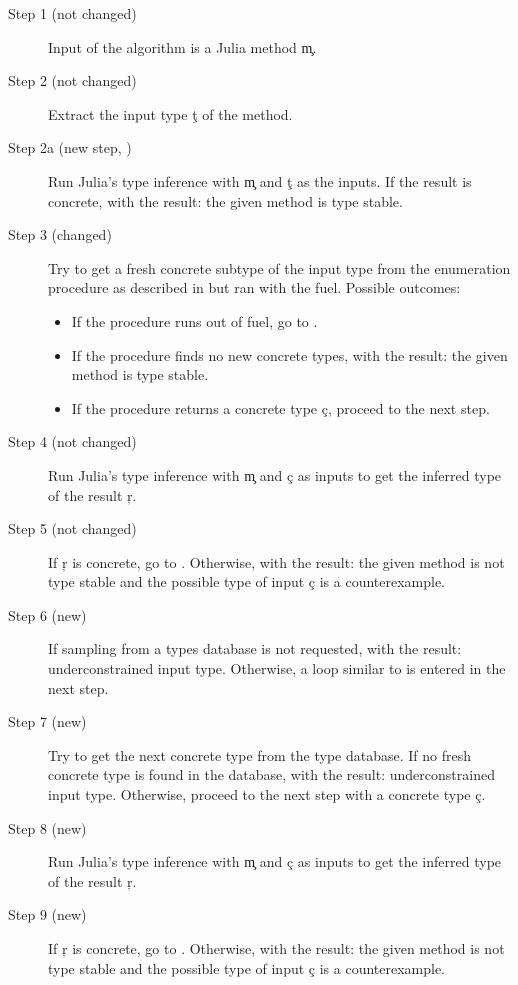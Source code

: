 \begin{description}
  \item[Step 1 (not changed)] Input of the algorithm is a Julia method \c{m}.
  \item[Step 2 (not changed)] Extract the input type \c{t} of the method.
  \item[Step 2a (new step, )]
    Run Julia's type inference with \c m and \c t as the
    inputs. If the result is concrete,  with the result: the given
    method is type stable.
  \item[Step 3 (changed)] Try to get a fresh concrete subtype of the input type
    from the enumeration procedure as described in 
    but ran with the fuel. Possible outcomes:
    \begin{itemize}
      \item If the procedure runs out of fuel, go to
        .
      \item If the procedure finds no new concrete types,  with the
      result: the given method is type stable.
      \item If the procedure returns a concrete type \c c, proceed to the next step.
    \end{itemize}
  \item[Step 4 (not changed)] Run Julia’s type inference with \c m and \c c as
    inputs to get the inferred type of the result \c r.
  \item[Step 5 (not changed)]
    If \c r  is concrete, go to . Otherwise, 
    with the result: the given method is not type stable and the possible type
    of input \c c is a counterexample.
  \item[Step 6 (new)]
    If sampling from a types database is not requested,  with
    the result: underconstrained input type.
    Otherwise,
    a loop similar to
     is entered in the next step.
  \item[Step 7 (new)]
    Try to get the next concrete type from the type database.
    If no fresh concrete type is found in the database,  with
    the result: underconstrained input type.
    Otherwise, proceed to the next step with a concrete type \c c.
  \item[Step 8 (new)]
    Run Julia’s type inference with \c m and \c c as
    inputs to get the inferred type of the result \c r.
  \item[Step 9 (new)]
    If \c r  is concrete, go to . Otherwise, 
    with the result: the given method is not type stable and the possible type
    of input \c c is a counterexample.
\end{description}

